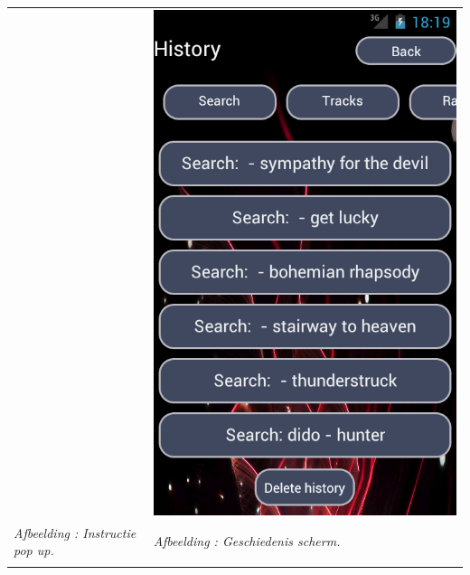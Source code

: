 \documentclass[11pt,a4paper]{article}
\newcounter{figc}
\newcommand{\figID} {%
   \stepcounter{figc}%
   \thefigc}
\begin{document}
{\begin{tabular} {p{7cm} >{\centering\arraybackslash}p{7cm}@{\hskip 0.5in}}
		& \includegraphics[scale=0.32]{Pictures/device-2013-05-31-202010.png} \\
		
		\centering \small \textit{Afbeelding \figID : Instructie pop up.}  \normalsize
		&  \small \textit{Afbeelding \figID : Geschiedenis scherm.} \\  \normalsize
		\vspace{1pt} & \vspace{1pt} \\
		

\end{tabular}}
\end{document}
